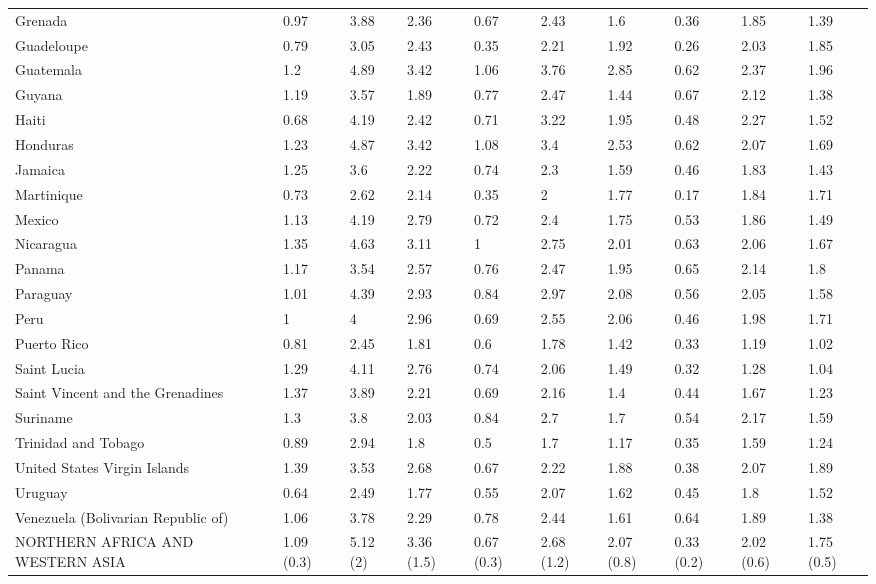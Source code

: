 \begin{longtable}[t]{llllllllll}
Grenada & 0.97 & 3.88 & 2.36 & 0.67 & 2.43 & 1.6 & 0.36 & 1.85 & 1.39\\
Guadeloupe & 0.79 & 3.05 & 2.43 & 0.35 & 2.21 & 1.92 & 0.26 & 2.03 & 1.85\\
Guatemala & 1.2 & 4.89 & 3.42 & 1.06 & 3.76 & 2.85 & 0.62 & 2.37 & 1.96\\
Guyana & 1.19 & 3.57 & 1.89 & 0.77 & 2.47 & 1.44 & 0.67 & 2.12 & 1.38\\
Haiti & 0.68 & 4.19 & 2.42 & 0.71 & 3.22 & 1.95 & 0.48 & 2.27 & 1.52\\
Honduras & 1.23 & 4.87 & 3.42 & 1.08 & 3.4 & 2.53 & 0.62 & 2.07 & 1.69\\
Jamaica & 1.25 & 3.6 & 2.22 & 0.74 & 2.3 & 1.59 & 0.46 & 1.83 & 1.43\\
Martinique & 0.73 & 2.62 & 2.14 & 0.35 & 2 & 1.77 & 0.17 & 1.84 & 1.71\\
Mexico & 1.13 & 4.19 & 2.79 & 0.72 & 2.4 & 1.75 & 0.53 & 1.86 & 1.49\\
Nicaragua & 1.35 & 4.63 & 3.11 & 1 & 2.75 & 2.01 & 0.63 & 2.06 & 1.67\\
Panama & 1.17 & 3.54 & 2.57 & 0.76 & 2.47 & 1.95 & 0.65 & 2.14 & 1.8\\
Paraguay & 1.01 & 4.39 & 2.93 & 0.84 & 2.97 & 2.08 & 0.56 & 2.05 & 1.58\\
Peru & 1 & 4 & 2.96 & 0.69 & 2.55 & 2.06 & 0.46 & 1.98 & 1.71\\
Puerto Rico & 0.81 & 2.45 & 1.81 & 0.6 & 1.78 & 1.42 & 0.33 & 1.19 & 1.02\\
Saint Lucia & 1.29 & 4.11 & 2.76 & 0.74 & 2.06 & 1.49 & 0.32 & 1.28 & 1.04\\
Saint Vincent and the Grenadines & 1.37 & 3.89 & 2.21 & 0.69 & 2.16 & 1.4 & 0.44 & 1.67 & 1.23\\
Suriname & 1.3 & 3.8 & 2.03 & 0.84 & 2.7 & 1.7 & 0.54 & 2.17 & 1.59\\
Trinidad and Tobago & 0.89 & 2.94 & 1.8 & 0.5 & 1.7 & 1.17 & 0.35 & 1.59 & 1.24\\
United States Virgin Islands & 1.39 & 3.53 & 2.68 & 0.67 & 2.22 & 1.88 & 0.38 & 2.07 & 1.89\\
Uruguay & 0.64 & 2.49 & 1.77 & 0.55 & 2.07 & 1.62 & 0.45 & 1.8 & 1.52\\
Venezuela (Bolivarian Republic of) & 1.06 & 3.78 & 2.29 & 0.78 & 2.44 & 1.61 & 0.64 & 1.89 & 1.38\\
NORTHERN AFRICA AND WESTERN ASIA & 1.09 (0.3) & 5.12 (2) & 3.36 (1.5) & 0.67 (0.3) & 2.68 (1.2) & 2.07 (0.8) & 0.33 (0.2) & 2.02 (0.6) & 1.75 (0.5)\\

\end{longtable}
